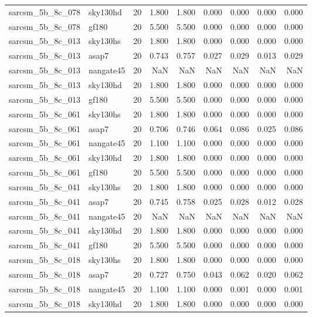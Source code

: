 \begin{tabular}{llrrrrrrr}
sarcsm\_5b\_8c\_078 & sky130hd & 20 & 1.800 & 1.800 & 0.000 & 0.000 & 0.000 & 0.000 \\
sarcsm\_5b\_8c\_078 & gf180 & 20 & 5.500 & 5.500 & 0.000 & 0.000 & 0.000 & 0.000 \\
sarcsm\_5b\_8c\_013 & sky130hs & 20 & 1.800 & 1.800 & 0.000 & 0.000 & 0.000 & 0.000 \\
sarcsm\_5b\_8c\_013 & asap7 & 20 & 0.743 & 0.757 & 0.027 & 0.029 & 0.013 & 0.029 \\
sarcsm\_5b\_8c\_013 & nangate45 & 20 & NaN & NaN & NaN & NaN & NaN & NaN \\
sarcsm\_5b\_8c\_013 & sky130hd & 20 & 1.800 & 1.800 & 0.000 & 0.000 & 0.000 & 0.000 \\
sarcsm\_5b\_8c\_013 & gf180 & 20 & 5.500 & 5.500 & 0.000 & 0.000 & 0.000 & 0.000 \\
sarcsm\_5b\_8c\_061 & sky130hs & 20 & 1.800 & 1.800 & 0.000 & 0.000 & 0.000 & 0.000 \\
sarcsm\_5b\_8c\_061 & asap7 & 20 & 0.706 & 0.746 & 0.064 & 0.086 & 0.025 & 0.086 \\
sarcsm\_5b\_8c\_061 & nangate45 & 20 & 1.100 & 1.100 & 0.000 & 0.000 & 0.000 & 0.000 \\
sarcsm\_5b\_8c\_061 & sky130hd & 20 & 1.800 & 1.800 & 0.000 & 0.000 & 0.000 & 0.000 \\
sarcsm\_5b\_8c\_061 & gf180 & 20 & 5.500 & 5.500 & 0.000 & 0.000 & 0.000 & 0.000 \\
sarcsm\_5b\_8c\_041 & sky130hs & 20 & 1.800 & 1.800 & 0.000 & 0.000 & 0.000 & 0.000 \\
sarcsm\_5b\_8c\_041 & asap7 & 20 & 0.745 & 0.758 & 0.025 & 0.028 & 0.012 & 0.028 \\
sarcsm\_5b\_8c\_041 & nangate45 & 20 & NaN & NaN & NaN & NaN & NaN & NaN \\
sarcsm\_5b\_8c\_041 & sky130hd & 20 & 1.800 & 1.800 & 0.000 & 0.000 & 0.000 & 0.000 \\
sarcsm\_5b\_8c\_041 & gf180 & 20 & 5.500 & 5.500 & 0.000 & 0.000 & 0.000 & 0.000 \\
sarcsm\_5b\_8c\_018 & sky130hs & 20 & 1.800 & 1.800 & 0.000 & 0.000 & 0.000 & 0.000 \\
sarcsm\_5b\_8c\_018 & asap7 & 20 & 0.727 & 0.750 & 0.043 & 0.062 & 0.020 & 0.062 \\
sarcsm\_5b\_8c\_018 & nangate45 & 20 & 1.100 & 1.100 & 0.000 & 0.001 & 0.000 & 0.001 \\
sarcsm\_5b\_8c\_018 & sky130hd & 20 & 1.800 & 1.800 & 0.000 & 0.000 & 0.000 & 0.000 \\

\end{tabular}
